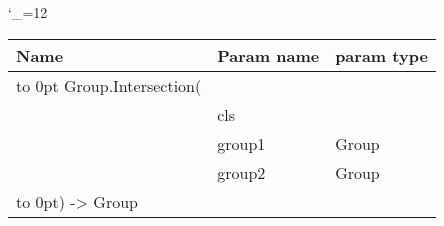 \begingroup \catcode`\_=12 \tt
\begin{tabular}{lll}
\toprule
\textrm{Name}&\textrm{Param name}&\textrm{param type}\\
\midrule
\hbox to 0pt {Group.Intersection(\hss}\\
& cls\\
& group1 & Group\\
& group2 & Group\\
\hbox to 0pt{) -> Group\hss}\\
\bottomrule
\end{tabular}
\endgroup
